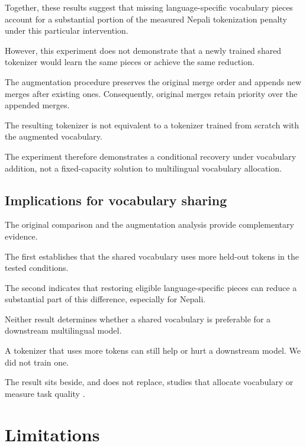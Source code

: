 \documentclass[10pt,twocolumn]{article}
\begin{document}
Together, these results suggest that missing
language-specific vocabulary pieces account for a
substantial portion of the measured Nepali tokenization
penalty under this particular intervention.

However, this experiment does not demonstrate that
a newly trained shared tokenizer would learn the same
pieces or achieve the same reduction.

The augmentation procedure preserves the original merge
order and appends new merges after existing ones.
Consequently, original merges retain priority over
the appended merges.

The resulting tokenizer is not equivalent to a tokenizer
trained from scratch with the augmented vocabulary.

The experiment therefore demonstrates a conditional
recovery under vocabulary addition, not a fixed-capacity
solution to multilingual vocabulary allocation.

\subsection{Implications for vocabulary sharing}

The original comparison and the augmentation analysis
provide complementary evidence.

The first establishes that the shared vocabulary uses
more held-out tokens in the tested conditions.

The second indicates that restoring eligible
language-specific pieces can reduce a substantial part
of this difference, especially for Nepali.

Neither result determines whether a shared vocabulary
is preferable for a downstream multilingual model.

A tokenizer that uses more tokens can still help or hurt
a downstream model. We did not train one.

The result sits beside, and does not replace, studies
that allocate vocabulary or measure task quality
\citep{chung-etal-2020-improving,liang-etal-2023-xlm,
brahma-etal-2026-multilingual,ali-etal-2024-tokenizer}.


\section{Limitations}
\end{document}
